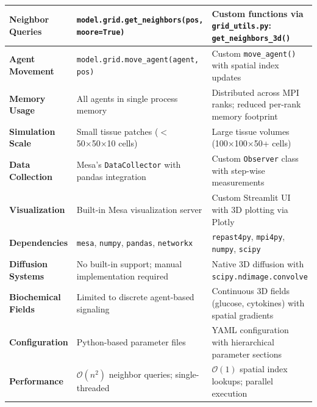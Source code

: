 \begin{table}[H]
\begin{tabular}{@{}p{3.5cm}p{5cm}p{5cm}@{}}
\midrule
\textbf{Neighbor Queries} & \texttt{model.grid.get\_neighbors(pos, moore=True)} & Custom functions via \texttt{grid\_utils.py}: \texttt{get\_neighbors\_3d()} \\
\midrule
\textbf{Agent Movement} & \texttt{model.grid.move\_agent(agent, pos)} & Custom \texttt{move\_agent()} with spatial index updates \\
\midrule
\textbf{Memory Usage} & All agents in single process memory & Distributed across MPI ranks; reduced per-rank memory footprint \\
\midrule
\textbf{Simulation Scale} & Small tissue patches ($<$50×50×10 cells) & Large tissue volumes (100×100×50+ cells) \\
\midrule
\textbf{Data Collection} & Mesa's \texttt{DataCollector} with pandas integration & Custom \texttt{Observer} class with step-wise measurements \\
\midrule
\textbf{Visualization} & Built-in Mesa visualization server & Custom Streamlit UI with 3D plotting via Plotly \\
\midrule
\textbf{Dependencies} & \texttt{mesa}, \texttt{numpy}, \texttt{pandas}, \texttt{networkx} & \texttt{repast4py}, \texttt{mpi4py}, \texttt{numpy}, \texttt{scipy} \\
\midrule
\textbf{Diffusion Systems} & No built-in support; manual implementation required & Native 3D diffusion with \texttt{scipy.ndimage.convolve} \\
\midrule
\textbf{Biochemical Fields} & Limited to discrete agent-based signaling & Continuous 3D fields (glucose, cytokines) with spatial gradients \\
\midrule
\textbf{Configuration} & Python-based parameter files & YAML configuration with hierarchical parameter sections \\
\midrule
\textbf{Performance} & $\mathcal{O}(n^2)$ neighbor queries; single-threaded & $\mathcal{O}(1)$ spatial index lookups; parallel execution \\
\bottomrule
\end{tabular}
\end{table}